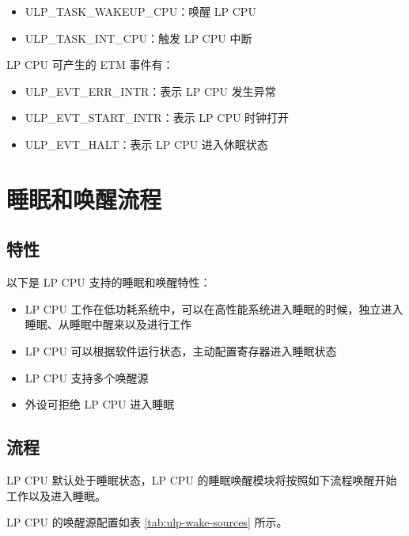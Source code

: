 \documentclass[main\_\_CN.tex]{subfiles}
\begin{document}
\begin{itemize}
    \item ULP\_TASK\_WAKEUP\_CPU：唤醒 LP CPU
    \item ULP\_TASK\_INT\_CPU：触发 LP CPU 中断
\end{itemize}

LP CPU 可产生的 ETM 事件有：

\begin{itemize}
    \item ULP\_EVT\_ERR\_INTR：表示 LP CPU 发生异常
    \item ULP\_EVT\_START\_INTR：表示 LP CPU 时钟打开
    \item ULP\_EVT\_HALT：表示 LP CPU 进入休眠状态

\end{itemize}




\section{睡眠和唤醒流程}\label{sec:sleep}
\subsection{特性}

以下是 LP CPU 支持的睡眠和唤醒特性：

\begin{itemize}
    \item LP CPU 工作在低功耗系统中，可以在高性能系统进入睡眠的时候，独立进入睡眠、从睡眠中醒来以及进行工作
    \item LP CPU 可以根据软件运行状态，主动配置寄存器进入睡眠状态
    \item LP CPU 支持多个唤醒源
   \item 外设可拒绝 LP CPU 进入睡眠
\end{itemize}

\subsection{流程}

LP CPU 默认处于睡眠状态，LP CPU 的睡眠唤醒模块将按照如下流程唤醒开始工作以及进入睡眠。

LP CPU 的唤醒源配置如表 \ref{tab:ulp-wake-sources} 所示。
\end{document}
